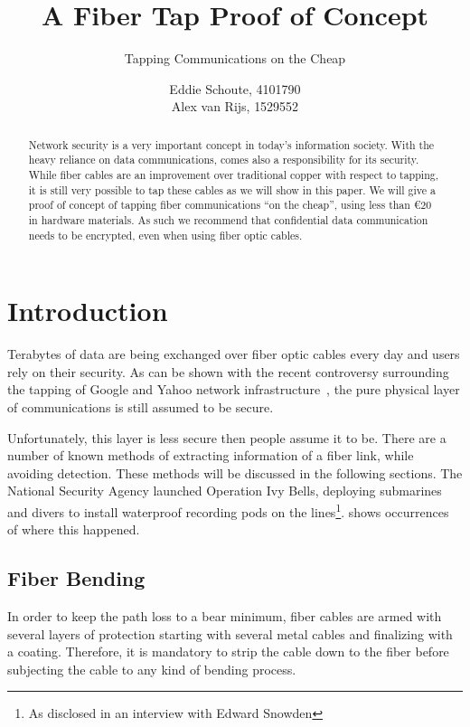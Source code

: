 \documentclass[11pt,twoside,a4paper]{scrartcl}
\title{A Fiber Tap Proof of Concept}
\subtitle{Tapping Communications on the Cheap}
\author{%
		Eddie Schoute, 4101790\\
		Alex van Rijs, 1529552
	}
\begin{document}
\maketitle

\begin{abstract}
	\noindent Network security is a very important concept in today's information society.
	With the heavy reliance on data communications, comes also a responsibility for its security.
	While fiber cables are an improvement over traditional copper with respect to tapping,
	it is still very possible to tap these cables as we will show in this paper.
	We will give a proof of concept of tapping fiber communications ``on the cheap'',
	using less than \euro{}$20$ in hardware materials.
	As such we recommend that confidential data communication needs to be encrypted,
	even when using fiber optic cables.
\end{abstract}

\section{Introduction}
	Terabytes of data are being exchanged over fiber optic cables every day and users rely on their security.
	As can be shown with the recent controversy surrounding the tapping of Google and Yahoo network infrastructure~\cite{googleyahootap},
	the pure physical layer of communications is still assumed to be secure.

	Unfortunately, this layer is less secure then people assume it to be.
	There are a number of known methods of extracting information of a fiber link, while avoiding detection.
	These methods will be discussed in the following sections.
	The National Security Agency launched Operation Ivy Bells,
	deploying submarines and divers to install waterproof recording pods on the lines\footnote{As disclosed in an interview with Edward Snowden}.
	\cite{fibertap} shows occurrences of where this happened.

	\subsection{Fiber Bending}
		In order to keep the path loss to a bear minimum, fiber cables are armed with several layers of protection starting with several metal cables and finalizing with a coating. Therefore, it is mandatory to strip the cable down to the fiber before subjecting the cable to any kind of bending process. 
\end{document}

